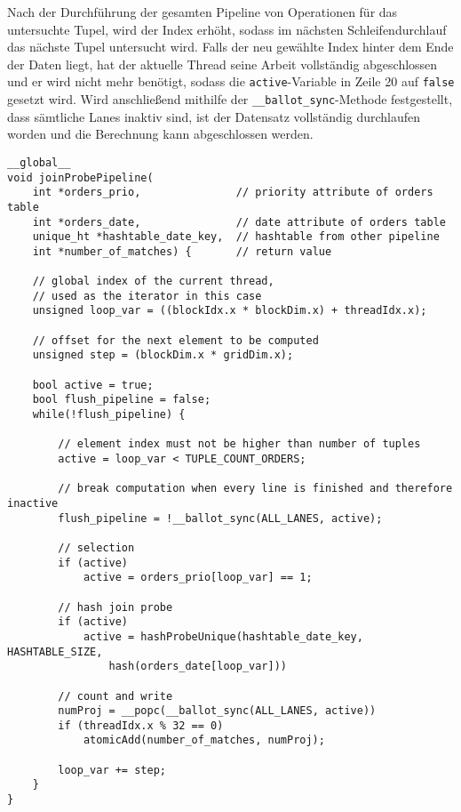 Nach der Durchführung der gesamten Pipeline von Operationen für das untersuchte Tupel, wird der Index erhöht, sodass im nächsten Schleifendurchlauf das nächste Tupel untersucht wird.
Falls der neu gewählte Index hinter dem Ende der Daten liegt, hat der aktuelle Thread seine Arbeit vollständig abgeschlossen und er wird nicht mehr benötigt, sodass die \texttt{active}-Variable in Zeile 20 auf \texttt{false} gesetzt wird.
Wird anschließend mithilfe der \texttt{\_\_ballot\_sync}-Methode festgestellt, dass sämtliche Lanes inaktiv sind, ist der Datensatz vollständig durchlaufen worden und die Berechnung kann abgeschlossen werden.

\begin{lstlisting}[language=MyC++,
caption=Generierter Kernel für den Beispielplan,
label=pipelining_example_code,
linebackgroundcolor={%
\ifnum\value{lstnumber}>24
	\ifnum\value{lstnumber}<28
		\color{red!25}
	\fi
\fi
\ifnum\value{lstnumber}>28
	\ifnum\value{lstnumber}<33
		\color{green!25}
	\fi
\fi
\ifnum\value{lstnumber}>33
	\ifnum\value{lstnumber}<38
		\color{yellow!25}
	\fi
\fi
}]
__global__
void joinProbePipeline(
	int *orders_prio,              	// priority attribute of orders table
	int *orders_date,               // date attribute of orders table
	unique_ht *hashtable_date_key,  // hashtable from other pipeline
	int *number_of_matches) {       // return value
	
	// global index of the current thread,
	// used as the iterator in this case
	unsigned loop_var = ((blockIdx.x * blockDim.x) + threadIdx.x);
	
	// offset for the next element to be computed
	unsigned step = (blockDim.x * gridDim.x);
	
	bool active = true;
	bool flush_pipeline = false;
	while(!flush_pipeline) {
	
		// element index must not be higher than number of tuples
		active = loop_var < TUPLE_COUNT_ORDERS;
		
		// break computation when every line is finished and therefore inactive
		flush_pipeline = !__ballot_sync(ALL_LANES, active);
		
		// selection
		if (active)
			active = orders_prio[loop_var] == 1;
		
		// hash join probe
		if (active)
			active = hashProbeUnique(hashtable_date_key, HASHTABLE_SIZE, 
				hash(orders_date[loop_var]))
		
		// count and write
		numProj = __popc(__ballot_sync(ALL_LANES, active))
		if (threadIdx.x % 32 == 0)
			atomicAdd(number_of_matches, numProj);
		
		loop_var += step;
	}
}
\end{lstlisting}
